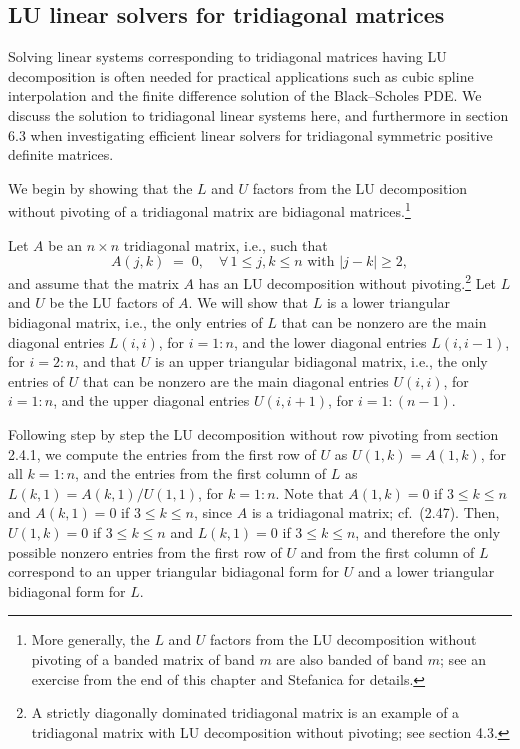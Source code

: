 \subsection{LU linear solvers for tridiagonal matrices}

Solving linear systems corresponding to tridiagonal matrices having LU
decomposition is often needed for practical applications such as cubic
spline interpolation and the finite difference solution of the
Black--Scholes PDE. We discuss the solution to tridiagonal linear systems
here, and furthermore in section 6.3 when investigating efficient linear
solvers for tridiagonal symmetric positive definite matrices.

We begin by showing that the $L$ and $U$ factors from the LU decomposition
without pivoting of a tridiagonal matrix are bidiagonal matrices.\footnote{More
generally, the $L$ and $U$ factors from the LU decomposition without
pivoting of a banded matrix of band $m$ are also banded of band $m$; see an
exercise from the end of this chapter and Stefanica \cite{38} for details.}

Let $A$ be an $n\times n$ tridiagonal matrix, i.e., such that
\begin{equation}
A(j,k) \;=\; 0, \quad \forall\, 1\le j,k\le n \text{ with } |j-k|\ge 2,
\end{equation}
and assume that the matrix $A$ has an LU decomposition without
pivoting.\footnote{A strictly diagonally dominated tridiagonal matrix is an
example of a tridiagonal matrix with LU decomposition without pivoting; see
section 4.3.} Let $L$ and $U$ be the LU factors of $A$. We will show that
$L$ is a lower triangular bidiagonal matrix, i.e., the only entries of $L$
that can be nonzero are the main diagonal entries $L(i,i)$, for $i=1:n$, and
the lower diagonal entries $L(i,i-1)$, for $i=2:n$, and that $U$ is an upper
triangular bidiagonal matrix, i.e., the only entries of $U$ that can be
nonzero are the main diagonal entries $U(i,i)$, for $i=1:n$, and the upper
diagonal entries $U(i,i+1)$, for $i=1:(n-1)$.

Following step by step the LU decomposition without row pivoting from
section 2.4.1, we compute the entries from the first row of $U$ as
$U(1,k)=A(1,k)$, for all $k=1:n$, and the entries from the first column of
$L$ as $L(k,1)=A(k,1)/U(1,1)$, for $k=1:n$. Note that $A(1,k)=0$ if
$3\le k\le n$ and $A(k,1)=0$ if $3\le k\le n$, since $A$ is a tridiagonal
matrix; cf.\ (2.47). Then, $U(1,k)=0$ if $3\le k\le n$ and $L(k,1)=0$ if
$3\le k\le n$, and therefore the only possible nonzero entries from the
first row of $U$ and from the first column of $L$ correspond to an upper
triangular bidiagonal form for $U$ and a lower triangular bidiagonal form
for $L$.

